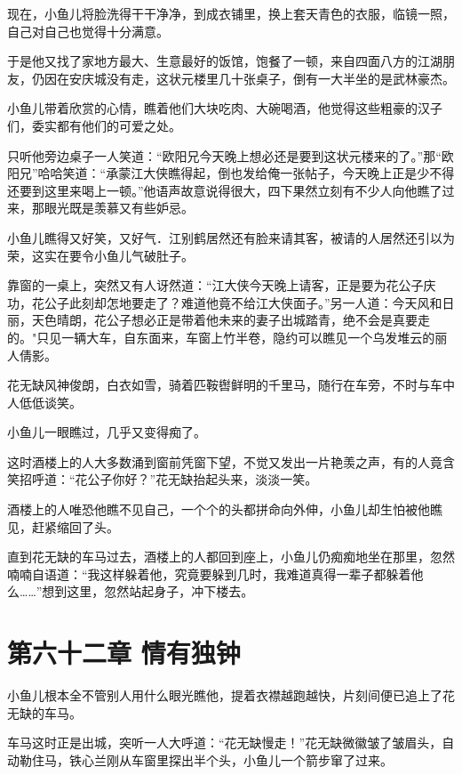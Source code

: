 \documentclass[12pt,oneside]{book}
\begin{document}
现在，小鱼儿将脸洗得干干净净，到成衣铺里，换上套天青色的衣服，临镜一照，自己对自己也觉得十分满意。

于是他又找了家地方最大、生意最好的饭馆，饱餐了一顿，来自四面八方的江湖朋友，仍因在安庆城没有走，这状元楼里几十张桌子，倒有一大半坐的是武林豪杰。

小鱼儿带着欣赏的心情，瞧着他们大块吃肉、大碗喝酒，他觉得这些粗豪的汉子们，委实都有他们的可爱之处。

只听他旁边桌子一人笑道：``欧阳兄今天晚上想必还是要到这状元楼来的了。''那``欧阳兄''哈哈笑道：``承蒙江大侠瞧得起，倒也发给俺一张帖子，今天晚上正是少不得还要到这里来喝上一顿。''他语声故意说得很大，四下果然立刻有不少人向他瞧了过来，那眼光既是羡慕又有些妒忌。

小鱼儿瞧得又好笑，又好气．江别鹤居然还有脸来请其客，被请的人居然还引以为荣，这实在要令小鱼儿气破肚子。

靠窗的一桌上，突然又有人讶然道：``江大侠今天晚上请客，正是要为花公子庆功，花公子此刻却怎地要走了？难道他竟不给江大侠面子。''另一人道：今天风和日丽，天色晴朗，花公子想必正是带着他未来的妻子出城踏青，绝不会是真要走的。"只见一辆大车，自东面来，车窗上竹半卷，隐约可以瞧见一个乌发堆云的丽人倩影。

花无缺风神俊朗，白衣如雪，骑着匹鞍辔鲜明的千里马，随行在车旁，不时与车中人低低谈笑。

小鱼儿一眼瞧过，几乎又变得痴了。

这时酒楼上的人大多数涌到窗前凭窗下望，不觉又发出一片艳羡之声，有的人竟含笑招呼道：``花公子你好？''花无缺抬起头来，淡淡一笑。

酒楼上的人唯恐他瞧不见自己，一个个的头都拼命向外伸，小鱼儿却生怕被他瞧见，赶紧缩回了头。

直到花无缺的车马过去，酒楼上的人都回到座上，小鱼儿仍痴痴地坐在那里，忽然喃喃自语道：``我这样躲着他，究竟要躲到几时，我难道真得一辈子都躲着他么\ldots\ldots{}''想到这里，忽然站起身子，冲下楼去。

\hypertarget{ux7b2cux516dux5341ux4e8cux7ae0-ux60c5ux6709ux72ecux949f}{%
\chapter{第六十二章
情有独钟}\label{ux7b2cux516dux5341ux4e8cux7ae0-ux60c5ux6709ux72ecux949f}}

小鱼儿根本全不管别人用什么眼光瞧他，提着衣襟越跑越快，片刻间便已追上了花无缺的车马。

车马这时正是出城，突听一人大呼道：``花无缺慢走！''花无缺微徽皱了皱眉头，自动勒住马，铁心兰刚从车窗里探出半个头，小鱼儿一个箭步窜了过来。
\end{document}
